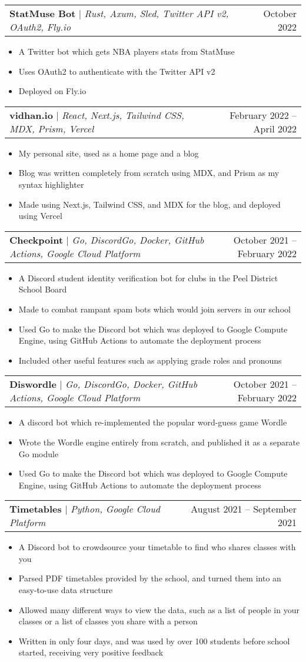 \documentclass[letterpaper,11pt]{article}
\makeatletter
\newcommand{\resumeItem}[1]{
  \item\small{
    {#1 \vspace{-2pt}}
  }
}
\newcommand{\resumeProjectHeading}[2]{
    \item
    \begin{tabular*}{0.97\textwidth}{l@{\extracolsep{\fill}}r}
      \small#1 & #2 \\
    \end{tabular*}\vspace{-7pt}
}
\newcommand{\resumeItemListStart}{\begin{itemize}}
\newcommand{\resumeItemListEnd}{\end{itemize}\vspace{-5pt}}
\makeatother
\begin{document}
\resumeProjectHeading
{\textbf{StatMuse Bot} $|$ \emph{Rust, Axum, Sled, Twitter API v2, OAuth2, Fly.io}}{October 2022}
\resumeItemListStart
\resumeItem{A Twitter bot which gets NBA players stats from StatMuse}
\resumeItem{Uses OAuth2 to authenticate with the Twitter API v2}
\resumeItem{Deployed on Fly.io}
\resumeItemListEnd

\resumeProjectHeading
{\textbf{vidhan.io} $|$ \emph{React, Next.js, Tailwind CSS, MDX, Prism, Vercel}}{February 2022 -- April 2022}
\resumeItemListStart
\resumeItem{My personal site, used as a home page and a blog}
\resumeItem{Blog was written completely from scratch using MDX, and Prism as my syntax highlighter}
\resumeItem{Made using Next.js, Tailwind CSS, and MDX for the blog, and deployed using Vercel}
\resumeItemListEnd

\resumeProjectHeading
{\textbf{Checkpoint} $|$ \emph{Go, DiscordGo, Docker, GitHub Actions, Google Cloud Platform}}{October 2021 -- February 2022}
\resumeItemListStart
\resumeItem{A Discord student identity verification bot for clubs in the Peel District School Board}
\resumeItem{Made to combat rampant spam bots which would join servers in our school}
\resumeItem{Used Go to make the Discord bot which was deployed to Google Compute Engine, using GitHub Actions to automate the deployment process}
\resumeItem{Included other useful features such as applying grade roles and pronouns}
\resumeItemListEnd

\resumeProjectHeading
{\textbf{Diswordle} $|$ \emph{Go, DiscordGo, Docker, GitHub Actions, Google Cloud Platform}}{October 2021 -- February 2022}
\resumeItemListStart
\resumeItem{A discord bot which re-implemented the popular word-guess game Wordle}
\resumeItem{Wrote the Wordle engine entirely from scratch, and published it as a separate Go module}
\resumeItem{Used Go to make the Discord bot which was deployed to Google Compute Engine, using GitHub Actions to automate the deployment process}
\resumeItemListEnd

\resumeProjectHeading
{\textbf{Timetables} $|$ \emph{Python, Google Cloud Platform}}{August 2021 -- September 2021}
\resumeItemListStart
\resumeItem{A Discord bot to crowdsource your timetable to find who shares classes with you}
\resumeItem{Parsed PDF timetables provided by the school, and turned them into an easy-to-use data structure}
\resumeItem{Allowed many different ways to view the data, such as a list of people in your classes or a list of classes you share with a person}
\resumeItem{Written in only four days, and was used by over 100 students before school started, receiving very positive feedback}
\resumeItemListEnd
\end{document}
